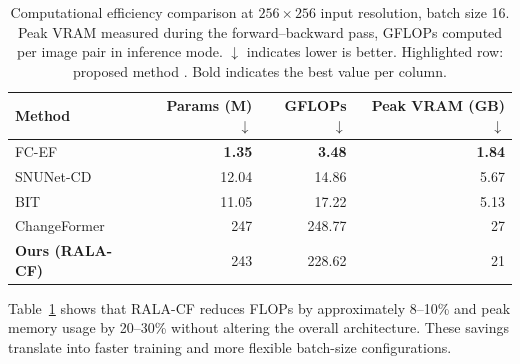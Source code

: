 \documentclass[runningheads]{llncs}
\newcommand{\journal}[1]{{\color{orange}#1}}
\begin{document}
\begin{table}
\centering
\caption{\journal{Computational efficiency comparison at $256\times256$ input
resolution, batch size 16. Peak VRAM measured during the forward--backward
pass, GFLOPs computed per image pair in inference mode. $\downarrow$ indicates
lower is better. \colorbox{pastelorange}{Highlighted} row: proposed method
\cite{acuna2026efficient}. Bold indicates the best value per column.}}
\label{tab:efficiency}
\begin{tabularx}{\textwidth}{|X|r|r|r|}
\hline
\textbf{Method}
    & \textbf{Params (M)} $\downarrow$
    & \textbf{GFLOPs} $\downarrow$
    & \textbf{Peak VRAM (GB)} $\downarrow$ \\
\hline
FC-EF \cite{Daudt2018SiamICIP}         &  \textbf{1.35} &   \textbf{3.48} &  \textbf{1.84} \\
SNUNet-CD \cite{Fang2021SNUNetCD}      & 12.04 &  14.86 &  5.67 \\
BIT \cite{Chen2022BIT}                 & 11.05 &  17.22 &  5.13 \\
ChangeFormer \cite{Bandara2022ChangeFormer} & 247 & 248.77 & 27 \\
\rowcolor{pastelorange}
\textbf{Ours (RALA-CF)} & 243 & 228.62 & 21 \\
\hline
\end{tabularx}
\end{table}

\noindent Table~\ref{tab:efficiency} shows that RALA-CF reduces FLOPs by
approximately 8--10\% and peak memory usage by 20--30\% without
altering the overall architecture. These savings translate into faster training
and more flexible batch-size configurations.
\end{document}
